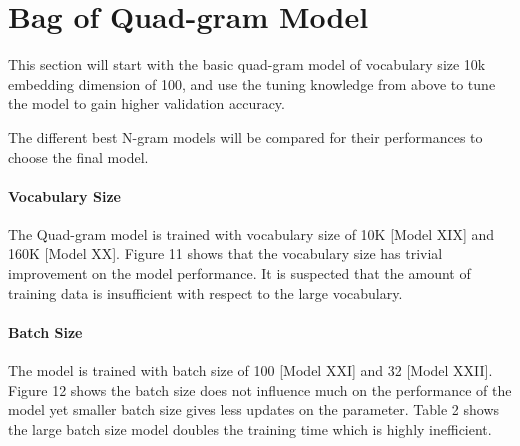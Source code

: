 \documentclass[10pt]{article}
\begin{document}
\section{Bag of Quad-gram Model}
This section will start with the basic quad-gram model of vocabulary size 10k embedding dimension of 100, and use the tuning knowledge from above to tune the model to gain higher validation accuracy. \par
The different best N-gram models will be compared for their performances to choose the final model.

\paragraph{Vocabulary Size}
The Quad-gram model is trained with vocabulary size of 10K [Model XIX] and 160K [Model XX].   Figure 11 shows that the vocabulary size has trivial improvement on the model performance. It is suspected that the amount of training data is insufficient with respect to the large vocabulary.

\paragraph{Batch Size}
The model is trained with batch size of 100 [Model XXI] and 32 [Model XXII]. 
Figure 12 shows the batch size does not influence much on the performance of the model yet smaller batch size gives less updates on the parameter.  Table 2 shows the large batch size model doubles the training time which is highly inefficient.
\end{document}
